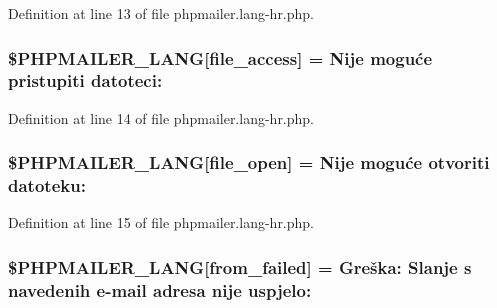 Definition at line 13 of file phpmailer.\+lang-\/hr.\+php.

\subsubsection[{\texorpdfstring{\$\+P\+H\+P\+M\+A\+I\+L\+E\+R\+\_\+\+L\+A\+NG}{$PHPMAILER_LANG}}]{\setlength{\rightskip}{0pt plus 5cm}\$P\+H\+P\+M\+A\+I\+L\+E\+R\+\_\+\+L\+A\+NG\mbox{[}\textquotesingle{}file\+\_\+access\textquotesingle{}\mbox{]} = \textquotesingle{}Nije moguće pristupiti datoteci\+: \textquotesingle{}}\hypertarget{phpmailer_8lang-hr_8php_a7e83349023b856ef9e5c46e30ae6d51e}{}\label{phpmailer_8lang-hr_8php_a7e83349023b856ef9e5c46e30ae6d51e}


Definition at line 14 of file phpmailer.\+lang-\/hr.\+php.

\subsubsection[{\texorpdfstring{\$\+P\+H\+P\+M\+A\+I\+L\+E\+R\+\_\+\+L\+A\+NG}{$PHPMAILER_LANG}}]{\setlength{\rightskip}{0pt plus 5cm}\$P\+H\+P\+M\+A\+I\+L\+E\+R\+\_\+\+L\+A\+NG\mbox{[}\textquotesingle{}file\+\_\+open\textquotesingle{}\mbox{]} = \textquotesingle{}Nije moguće otvoriti datoteku\+: \textquotesingle{}}\hypertarget{phpmailer_8lang-hr_8php_a28d1a6517bf4c942a0ddd506188ad2e0}{}\label{phpmailer_8lang-hr_8php_a28d1a6517bf4c942a0ddd506188ad2e0}


Definition at line 15 of file phpmailer.\+lang-\/hr.\+php.

\subsubsection[{\texorpdfstring{\$\+P\+H\+P\+M\+A\+I\+L\+E\+R\+\_\+\+L\+A\+NG}{$PHPMAILER_LANG}}]{\setlength{\rightskip}{0pt plus 5cm}\$P\+H\+P\+M\+A\+I\+L\+E\+R\+\_\+\+L\+A\+NG\mbox{[}\textquotesingle{}from\+\_\+failed\textquotesingle{}\mbox{]} =  Greška\+: Slanje {\bf s} navedenih {\bf e}-\/mail adresa nije uspjelo\+: \textquotesingle{}}\hypertarget{phpmailer_8lang-hr_8php_adf832ae12155a09be077c6d5e4fd7e22}{}\label{phpmailer_8lang-hr_8php_adf832ae12155a09be077c6d5e4fd7e22}


